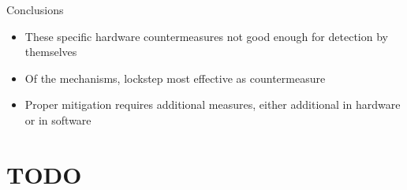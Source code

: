 \documentclass[table]{beamer}
\begin{document}
\begin{frame}{Conclusions}
    \begin{itemize}
        \item These specific hardware countermeasures not  good enough for detection by themselves
        \item Of the mechanisms, lockstep most effective as countermeasure
        \item Proper mitigation requires additional measures, either additional in hardware or in software
    \end{itemize}


\end{frame}

\section{TODO\ \ }
\end{document}
